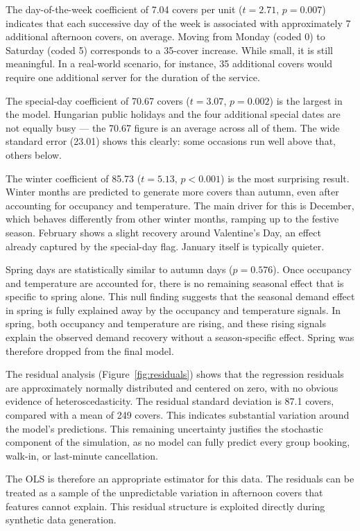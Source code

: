 \documentclass[12pt,a4paper,oneside]{article}
\begin{document}
The day-of-the-week coefficient of 7.04 covers per unit ($t = 2.71$, $p = 0.007$) indicates that each successive day of the week is associated with approximately 7 additional afternoon covers, on average. Moving from Monday (coded 0) to Saturday (coded 5) corresponds to a 35-cover increase. While small, it is still meaningful. In a real-world scenario, for instance, 35 additional covers would require one additional server for the duration of the service.

The special-day coefficient of 70.67 covers ($t = 3.07$, $p = 0.002$) is the largest in the model. Hungarian public holidays and the four additional special dates are not equally busy — the 70.67 figure is an average across all of them. The wide standard error (23.01) shows this clearly: some occasions run well above that, others below.

The winter coefficient of 85.73 (\(t = 5.13\), \(p < 0.001\)) is the most surprising result. Winter months are predicted to generate more covers than autumn, even after accounting for occupancy and temperature. The main driver for this is December, which behaves differently from other winter months, ramping up to the festive season. February shows a slight recovery around Valentine's Day, an effect already captured by the special-day flag. January itself is typically quieter.

Spring days are statistically similar to autumn days ($p = 0.576$). Once occupancy and temperature are accounted for, there is no remaining seasonal effect that is specific to spring alone. This null finding suggests that the seasonal demand effect in spring is fully explained away by the occupancy and temperature signals. In spring, both occupancy and temperature are rising, and these rising signals explain the observed demand recovery without a season-specific effect. Spring was therefore dropped from the final model.

The residual analysis (Figure~\ref{fig:residuals}) shows that the regression residuals are approximately normally distributed and centered on zero, with no obvious evidence of heteroscedasticity. The residual standard deviation is 87.1 covers, compared with a mean of 249 covers. This indicates substantial variation around the model's predictions. This remaining uncertainty justifies the stochastic component of the simulation, as no model can fully predict every group booking, walk-in, or last-minute cancellation.

The OLS is therefore an appropriate estimator for this data. The residuals can be treated as a sample of the unpredictable variation in afternoon covers that features cannot explain. This residual structure is exploited directly during synthetic data generation.
\end{document}
